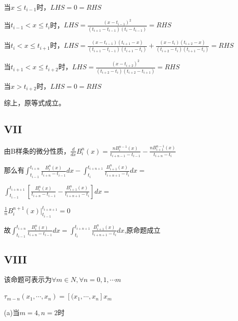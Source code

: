 \documentclass[12]{article}%
\begin{document}
        当$x\le t_{i-1}$时，$LHS=0=RHS$

        当$t_{i-1}<x\le t_{i}$时，$LHS=\frac{(x-t_{i-1})^2}{(t_{i+1}-t_{i-1})(t_{i}-t_{i-1})}=RHS$

        当$t_i<x\le t_{i+1}$时，$LHS=\frac{(x-t_{i-1})(t_{i+1}-x)}{(t_{i+1}-t_{i-1})(t_{i+1}-t_{i})}+\frac{(x-t_{i})(t_{i+2}-x)}{(t_{i+2}-t_{i})(t_{i+1}-t_{i})}=RHS$

        当$t_{i+1}<x\le t_{i+2}$时，$LHS=\frac{(x-t_{i+2})^2}{(t_{i+2}-t_{i})(t_{i+2}-t_{i+1})}=RHS$

        当$x> t_{i+2}$时，$LHS=0=RHS$

        综上，原等式成立。
            

        \subsection{VII}
            由B样条的微分性质，$\frac{d}{dx}B_i^n(x)=\frac{nB^{n-1}_i(x)}{t_{i+n-1}-t_{i-1}}-\frac{nB^{n-1}_{i+1}(x)}{t_{i+n}-t_{i}}$

            那么有$\int_{t_{i-1}}^{t_{i+n}}\frac{B^n_i(x)}{t_{i+n}-t_{i-1}}dx-\int_{t_{i}}^{t_{i+n+1}}\frac{B^n_{i+1}(x)}{t_{i+n+1}-t_{i}}dx=$

            $\int_{t_{i-1}}^{t_{i+n+1}}[\frac{B^n_i(x)}{t_{i+n}-t_{i-1}}-\frac{B^n_{i+1}(x)}{t_{i+n+1}-t_{i}}]dx=$
            
            $\frac{1}{n}B^{n+1}_i(x)|_{t_{i-1}}^{t_{i+n+1}}=0$ 
            
            故$\int_{t_{i-1}}^{t_{i+n}}\frac{B^n_i(x)}{t_{i+n}-t_{i-1}}dx=\int_{t_{i}}^{t_{i+n+1}}\frac{B^n_{i+1}(x)}{t_{i+n+1}-t_{i}}dx$,原命题成立
        \subsection{VIII}
            该命题可表示为$\forall m \in N ,\forall n=0,1,\cdots m$

            $\tau_{m-n}(x_1,\cdots,x_n)=[(x_1,\cdots,x_n]x_m$

            (a)当$m=4,n=2$时
\end{document}
